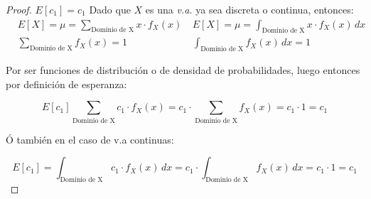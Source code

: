 \begin{proof}$E\left[ c_1\right]=c_1$
    Dado que $X$ es una \textit{v.a.} ya sea discreta o continua,
    entonces:
\begin{align*}
         & E\left[ X\right]=\mu = \sum_{\text{Dominio de X}}x\cdot f_X(x) &  & E\left[  X\right]=\mu = \int_{\text{Dominio de X}}x\cdot f_X(x)\,dx \\
         & \sum_{\text{Dominio de X}}f_X(x)=1                             &  & \int_{\text{Dominio de X}}f_X(x)\,dx=1
    \end{align*}

    Por ser funciones de distribución o de densidad de
    probabilidades, luego entonces por definición de
    esperanza:

    \begin{equation*}
        E\left[ c_1\right] \sum_{\text{Dominio de X}}c_1\cdot f_X(x)=c_1\cdot  \sum_{\text{Dominio de X}}f_X(x)=c_1\cdot 1=c_1
    \end{equation*}

    Ó también en el caso de v.a continuas:

    \begin{equation*}
        E\left[ c_1\right]= \int_{\text{Dominio de X}}c_1\cdot f_X(x)\,dx=c_1\cdot  \int_{\text{Dominio de X}}f_X( x)\,dx=c_1\cdot 1=c_1
    \end{equation*}
\end{proof}

